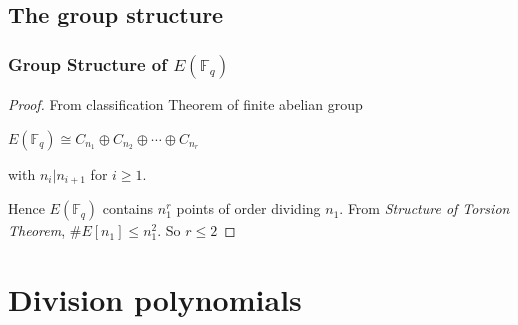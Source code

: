 \documentclass[12pt,handout]{beamer} %
\newcommand{\F}{\mathbb F}
\theoremstyle{definition}
\begin{document}
\subsection{The group structure}
\begin{frame}\frametitle{Group Structure of $E(\F_q)$}

\pause

\begin{proof}
From classification Theorem of finite abelian group\\
\centerline{$E(\F_q)\cong  C_{n_1}\oplus C_{n_2}\oplus\cdots\oplus C_{n_r}$}
with $n_i|n_{i+1}$ for $i\ge1$.\pause

Hence $E(\F_q)$ contains $n_1^r$ points of order dividing $n_1$. From
\emph{Structure of Torsion Theorem}, $\#E[n_1]\le n_1^2$.
So $r\le2$\end{proof}\pause

% 
\end{frame}


\section{Division polynomials}
\end{document}
